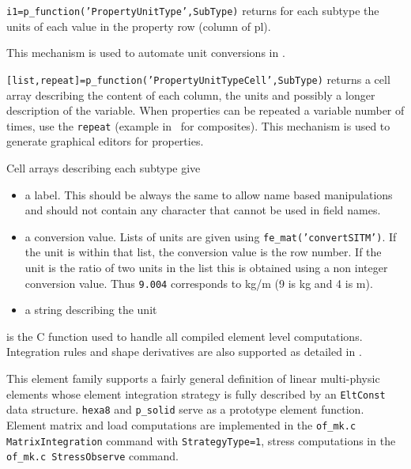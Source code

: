 
{\tt i1=p\_function('PropertyUnitType',SubType)} returns for each subtype the units of each value in the property row (column of pl).

 This mechanism is used to automate unit conversions in .

{\tt [list,repeat]=p\_function('PropertyUnitTypeCell',SubType)} returns a cell array describing the content of each column, the units and possibly a longer description of the variable. When properties can be repeated a variable number of times, use the {\tt repeat} (example in \pshell\ for composites). This mechanism is used to generate graphical editors for properties.

Cell arrays describing each subtype give

\begin{itemize}
\item a label. This should be always the same to allow name based manipulations and should not contain any character that cannot be used in field names.
\item  a conversion value. Lists of units are given using {\tt fe\_mat('convertSITM')}. If the unit is within that list, the conversion value is the row number. If the unit is the ratio of two units in the list this is obtained using a non integer conversion value. Thus {\tt 9.004} corresponds to kg/m (9 is kg and 4 is m). 
\item a string describing the unit
\end{itemize}


 is the C function used to handle all compiled element level computations. Integration rules and shape derivatives are also supported as detailed in .


This element family supports a fairly general definition of linear multi-physic elements whose element integration strategy is fully described by an {\tt EltConst} data structure.  {\tt hexa8} and {\tt p\_solid} serve as a prototype element function. Element matrix and load computations are implemented in the {\tt of\_mk.c MatrixIntegration} command with {\tt StrategyType=1}, stress computations in the {\tt of\_mk.c StressObserve} command.

